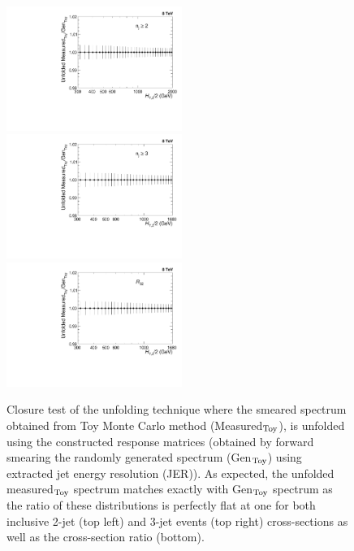 \begin{figure}[!ht]
 \begin{center}
 \hspace*{-3mm}\includegraphics[width=0.51\textwidth]{Plots_HT_2_150/Ratio_Unfolding_NLO_2_funcI.pdf}%
 ~~\includegraphics[width=0.51\textwidth]{Plots_HT_2_150/Ratio_Unfolding_NLO_3_funcI.pdf}\\
 \includegraphics[width=0.51\textwidth]{Plots_HT_2_150/Ratio_Unfolding_NLO_Ratio_32_funcI.pdf}
 \caption[Closure test of the unfolding technique .]{Closure test of the unfolding technique where the smeared spectrum obtained from Toy Monte Carlo method (Measured$_{\rm Toy}$), is unfolded using the constructed response matrices (obtained by forward smearing the randomly generated spectrum (Gen$_{\rm Toy}$) using extracted jet energy resolution (JER)). As expected, the unfolded measured$_{\rm Toy}$ spectrum matches exactly with Gen$_{\rm Toy}$ spectrum as the ratio of these distributions is perfectly flat at one for both inclusive 2-jet (top left) and 3-jet events (top right) cross-sections as well as the cross-section ratio \ratio (bottom).}
 \label{fig:unfolded_smeared}
 \end{center}
\end{figure}

